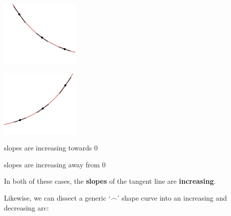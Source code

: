 \begin{center}

\begin{multicols}{2}

\includegraphics[width=1.5in]{./AppDerivativesGraphics/DecCU.png} 

\includegraphics[width=1.5in]{./AppDerivativesGraphics/IncCU.png} 


\end{multicols}

\end{center}

\begin{center}

\begin{multicols}{2}

slopes are increasing towards $0$

slopes are increasing away from $0$

\end{multicols}

\end{center}

In both of these cases, the \textbf{slopes} of the tangent line are \textbf{increasing}.  

\medskip

Likewise, we can dissect a generic `$\frown$' shape curve into an increasing and decreasing arc:

